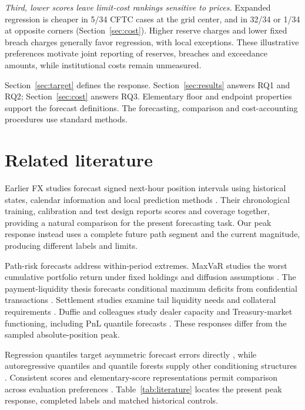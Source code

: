 \documentclass[11pt,a4paper]{article}
\begin{document}
\textit{Third, lower scores leave limit-cost rankings sensitive to prices.} Expanded regression is cheaper in 5/34 CFTC cases at the grid center, and in 32/34 or 1/34 at opposite corners (Section~\ref{sec:cost}). Higher reserve charges and lower fixed breach charges generally favor regression, with local exceptions. These illustrative preferences motivate joint reporting of reserves, breaches and exceedance amounts, while institutional costs remain unmeasured.

Section~\ref{sec:target} defines the response. Section~\ref{sec:results} answers RQ1 and RQ2; Section~\ref{sec:cost} answers RQ3. Elementary floor and endpoint properties support the forecast definitions. The forecasting, comparison and cost-accounting procedures use standard methods.

\FloatBarrier

\section{Related literature}\label{sec:literature}

Earlier FX studies forecast signed next-hour position intervals using historical states, calendar information and local prediction methods \citep{wisniewski2020,wisniewski2024}. Their chronological training, calibration and test design reports scores and coverage together, providing a natural comparison for the present forecasting task. Our peak response instead uses a complete future path segment and the current magnitude, producing different labels and limits.


Path-risk forecasts address within-period extremes. MaxVaR studies the worst cumulative portfolio return under fixed holdings and diffusion assumptions \citep{boudoukh2004}. The payment-liquidity thesis forecasts conditional maximum deficits from confidential transactions \citep{hoogen2017}. Settlement studies examine tail liquidity needs and collateral requirements \citep{petrunia2019,arjani2020}. Duffie and colleagues study dealer capacity and Treasury-market functioning, including PnL quantile forecasts \citep{duffie2023}. These responses differ from the sampled absolute-position peak.


Regression quantiles target asymmetric forecast errors directly \citep{koenker1978}, while autoregressive quantiles and quantile forests supply other conditioning structures \citep{engle2004,meinshausen2006}. Consistent scores and elementary-score representations permit comparison across evaluation preferences \citep{gneiting2011,ehm2016}. Table~\ref{tab:literature} locates the present peak response, completed labels and matched historical controls.
\end{document}
